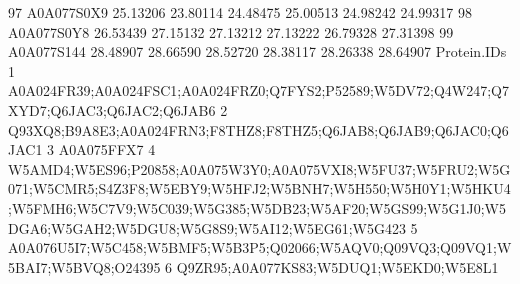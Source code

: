 \documentclass{beamer}
\begin{document}
\begin{frame}[fragile]
\begin{itemize}
\begin{Schunk}
\begin{Soutput}
97   A0A077S0X9 25.13206 23.80114 24.48475  25.00513  24.98242  24.99317
98   A0A077S0Y8 26.53439 27.15132 27.13212  27.13222  26.79328  27.31398
99   A0A077S144 28.48907 28.66590 28.52720  28.38117  28.26338  28.64907
                                                                                                                                                                                                                                                                                                                                                                      Protein.IDs
1                                                                                                                                                                                                                                                                                        A0A024FR39;A0A024FSC1;A0A024FRZ0;Q7FYS2;P52589;W5DV72;Q4W247;Q7XYD7;Q6JAC3;Q6JAC2;Q6JAB6
2                                                                                                                                                                                                                                                                                                              Q93XQ8;B9A8E3;A0A024FRN3;F8THZ8;F8THZ5;Q6JAB8;Q6JAB9;Q6JAC0;Q6JAC1
3                                                                                                                                                                                                                                                                                                                                                                      A0A075FFX7
4                                                                                                                                                W5AMD4;W5ES96;P20858;A0A075W3Y0;A0A075VXI8;W5FU37;W5FRU2;W5G071;W5CMR5;S4Z3F8;W5EBY9;W5HFJ2;W5BNH7;W5H550;W5H0Y1;W5HKU4;W5FMH6;W5C7V9;W5C039;W5G385;W5DB23;W5AF20;W5GS99;W5G1J0;W5DGA6;W5GAH2;W5DGU8;W5G8S9;W5AI12;W5EG61;W5G423
5                                                                                                                                                                                                                                                                                                A0A076U5I7;W5C458;W5BMF5;W5B3P5;Q02066;W5AQV0;Q09VQ3;Q09VQ1;W5BAI7;W5BVQ8;O24395
6                                                                                                                                                                                                                                                                                                                                          Q9ZR95;A0A077KS83;W5DUQ1;W5EKD0;W5E8L1

\end{Soutput}
\end{Schunk}
\end{itemize}
\end{frame}
\end{document}
